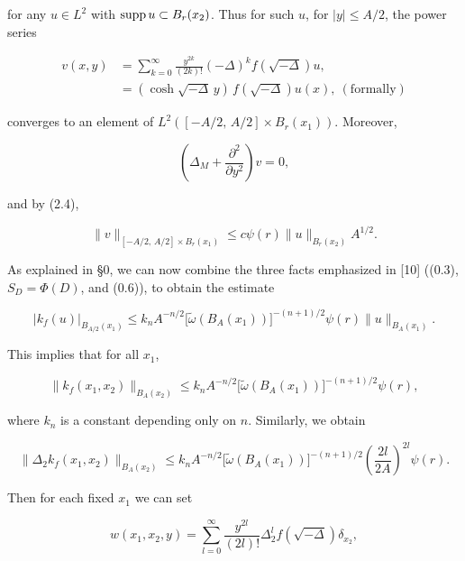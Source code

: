 for any $u \in L^2$ with $\operatorname{supp} u \subset B_r(x_2)$. Thus for such $u$, for $|y| \le A/2$, the
power series

\begin{equation}\tag{2.5}
\begin{aligned}
v(x,y) &= \sum_{k=0}^\infty \frac{y^{2k}}{(2k)!}(-\Delta)^k f(\sqrt{-\Delta})u,\\
&= (\cosh \sqrt{-\Delta}\, y)\,f(\sqrt{-\Delta})u(x),\ (\mathrm{formally})
\end{aligned}
\end{equation}

converges to an element of $L^2([ -A/2,\, A/2]\times B_r(x_1))$. Moreover,

\begin{equation}\tag{2.6}
\left(\Delta_M + \frac{\partial^2}{\partial y^2}\right)v = 0,
\end{equation}

and by (2.4),

\begin{equation}\tag{2.7}
\|v\|_{[-A/2,\,A/2]\times B_r(x_1)} \le c\psi(r)\|u\|_{B_r(x_2)}A^{1/2}.
\end{equation}

As explained in \S0, we can now combine the three facts emphasized in [10]
((0.3), $S_D=\Phi(D)$, and (0.6)), to obtain the estimate

\begin{equation}\tag{2.8}
\left|k_f(u)\right|_{B_{A/2}(x_1)}
\le k_nA^{-n/2}\bigl[\tilde{\omega}(B_A(x_1))\bigr]^{-(n+1)/2}\psi(r)\|u\|_{B_A(x_1)}.
\end{equation}

This implies that for all $x_1$,

\begin{equation}\tag{2.9}
\|k_f(x_1,x_2)\|_{B_A(x_2)}
\le k_nA^{-n/2}\bigl[\tilde{\omega}(B_A(x_1))\bigr]^{-(n+1)/2}\psi(r),
\end{equation}

where $k_n$ is a constant depending only on $n$. Similarly, we obtain

\begin{equation}\tag{2.10}
\|\Delta_2 k_f(x_1,x_2)\|_{B_A(x_2)}
\le k_nA^{-n/2}\bigl[\tilde{\omega}(B_A(x_1))\bigr]^{-(n+1)/2}
\left(\frac{2l}{2A}\right)^{2l}\psi(r).
\end{equation}

Then for each fixed $x_1$ we can set

\begin{equation}\tag{2.11}
w(x_1,x_2,y)=\sum_{l=0}^{\infty}\frac{y^{2l}}{(2l)!}\Delta_2^l f(\sqrt{-\Delta})\delta_{x_2},
\end{equation}

